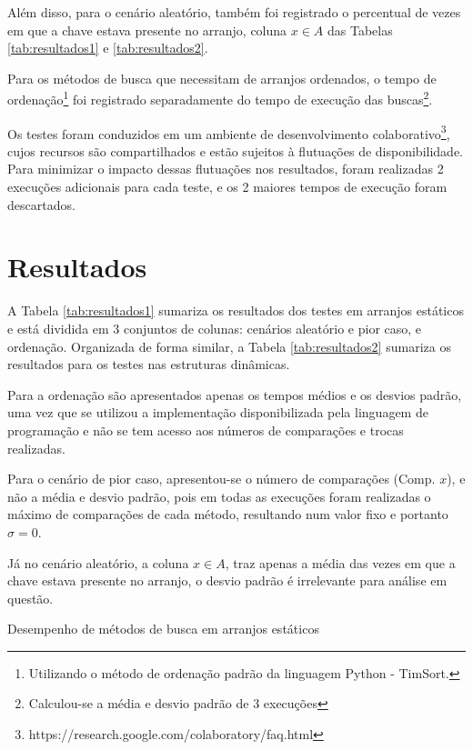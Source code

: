 \documentclass[12pt]{article}
\begin{document}
Além disso, para o cenário aleatório, também foi registrado o percentual de vezes em que a chave estava presente no arranjo, coluna $x \in A$ das Tabelas \ref{tab:resultados1} e \ref{tab:resultados2}.

Para os métodos de busca que necessitam de arranjos ordenados, o tempo de ordenação\footnote{Utilizando o método de ordenação padrão da linguagem Python - TimSort.} foi registrado separadamente do tempo de execução das buscas\footnote{Calculou-se a média e desvio padrão de 3 execuções}.

Os testes foram conduzidos em um ambiente de desenvolvimento colaborativo\footnote{https://research.google.com/colaboratory/faq.html}, cujos recursos são compartilhados e estão sujeitos à flutuações de disponibilidade. Para minimizar o impacto dessas flutuações nos resultados, foram realizadas 2 execuções adicionais para cada teste, e os 2 maiores tempos de execução foram descartados.

\section{Resultados}
A Tabela \ref{tab:resultados1} sumariza os resultados dos testes em arranjos estáticos e está dividida em 3 conjuntos de colunas: cenários aleatório e pior caso, e ordenação. 
Organizada de forma similar, a Tabela \ref{tab:resultados2} sumariza os resultados para os testes nas estruturas dinâmicas.

Para a ordenação são apresentados apenas os tempos médios e os desvios padrão, uma vez que se utilizou a implementação disponibilizada pela linguagem de programação e não se tem acesso aos números de comparações e trocas realizadas.

Para o cenário de pior caso, apresentou-se o número de comparações (Comp. $x$), e não a média e desvio padrão, pois em todas as execuções foram realizadas o máximo de comparações de cada método, resultando num valor fixo e portanto $\sigma = 0$.

Já no cenário aleatório, a coluna $x \in A$, traz apenas a média das vezes em que a chave estava presente no arranjo, o desvio padrão é irrelevante para análise em questão.

\begin{table}[h]
    \centering
    \resizebox{\textwidth}{!}{
        
    }
    \caption{Desempenho de métodos de busca em arranjos estáticos}
    \label{tab:resultados1}
\end{table} 
\end{document}

